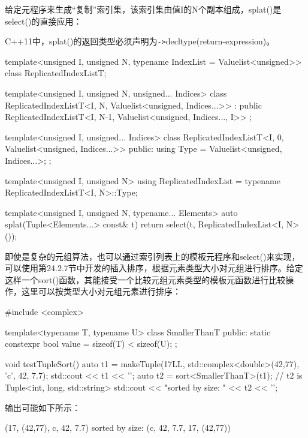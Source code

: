 给定元程序来生成“复制”索引集，该索引集由值I的N个副本组成，splat()是select()的直接应用：

\begin{notice}
C++11中，splat()的返回类型必须声明为\texttt{->}decltype(return-expression)。
\end{notice}

\begin{cpp}
template<unsigned I, unsigned N, typename IndexList = Valuelist<unsigned>>
class ReplicatedIndexListT;

template<unsigned I, unsigned N, unsigned... Indices>
class ReplicatedIndexListT<I, N, Valuelist<unsigned, Indices...>>
: public ReplicatedIndexListT<I, N-1,
								Valuelist<unsigned, Indices..., I>> {
};

template<unsigned I, unsigned... Indices>
class ReplicatedIndexListT<I, 0, Valuelist<unsigned, Indices...>> {
	public:
	using Type = Valuelist<unsigned, Indices...>;
};

template<unsigned I, unsigned N>
using ReplicatedIndexList = typename ReplicatedIndexListT<I, N>::Type;

template<unsigned I, unsigned N, typename... Elements>
auto splat(Tuple<Elements...> const& t)
{
	return select(t, ReplicatedIndexList<I, N>());
}
\end{cpp}

即使是复杂的元组算法，也可以通过索引列表上的模板元程序和select()来实现，可以使用第24.2.7节中开发的插入排序，根据元素类型大小对元组进行排序。给定这样一个sort()函数，其能接受一个比较元组元素类型的模板元函数进行比较操作，这里可以按类型大小对元组元素进行排序：

\begin{cpp}
#include <complex>

template<typename T, typename U>
class SmallerThanT
{
	public:
	static constexpr bool value = sizeof(T) < sizeof(U);
};

void testTupleSort()
{
	auto t1 = makeTuple(17LL, std::complex<double>(42,77), 'c', 42, 7.7);
	std::cout << t1 << '\n';
	auto t2 = sort<SmallerThanT>(t1); // t2 is Tuple<int, long, std::string>
	std::cout << "sorted by size: " << t2 << '\n';
}
\end{cpp}

输出可能如下所示：

\begin{cpp}
(17, (42,77), c, 42, 7.7)
sorted by size: (c, 42, 7.7, 17, (42,77))
\end{cpp}

